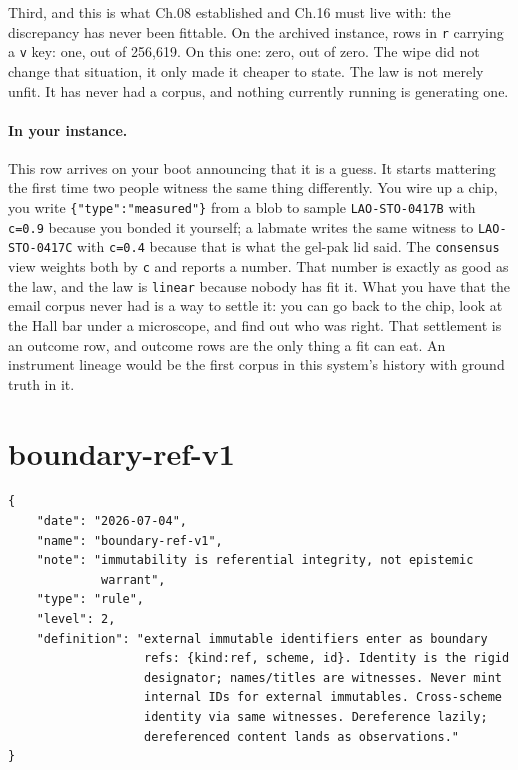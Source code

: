 Third, and this is what Ch.08 established and Ch.16 must live with: the discrepancy has never been fittable. On the archived instance, rows in \texttt{r} carrying a \texttt{v} key: one, out of 256,619. On this one: zero, out of zero. The wipe did not change that situation, it only made it cheaper to state. The law is not merely unfit. It has never had a corpus, and nothing currently running is generating one.

\paragraph{In your instance.} This row arrives on your boot announcing that it is a guess. It starts mattering the first time two people witness the same thing differently. You wire up a chip, you write \texttt{\{"type":"measured"\}} from a blob to sample \texttt{LAO-STO-0417B} with \texttt{c=0.9} because you bonded it yourself; a labmate writes the same witness to \texttt{LAO-STO-0417C} with \texttt{c=0.4} because that is what the gel-pak lid said. The \texttt{consensus} view weights both by \texttt{c} and reports a number. That number is exactly as good as the law, and the law is \texttt{linear} because nobody has fit it. What you have that the email corpus never had is a way to settle it: you can go back to the chip, look at the Hall bar under a microscope, and find out who was right. That settlement is an outcome row, and outcome rows are the only thing a fit can eat. An instrument lineage would be the first corpus in this system's history with ground truth in it.

\section{boundary-ref-v1}

\begin{lstlisting}[language={},basicstyle=\ttfamily\footnotesize]
{
    "date": "2026-07-04",
    "name": "boundary-ref-v1",
    "note": "immutability is referential integrity, not epistemic
             warrant",
    "type": "rule",
    "level": 2,
    "definition": "external immutable identifiers enter as boundary
                   refs: {kind:ref, scheme, id}. Identity is the rigid
                   designator; names/titles are witnesses. Never mint
                   internal IDs for external immutables. Cross-scheme
                   identity via same witnesses. Dereference lazily;
                   dereferenced content lands as observations."
}
\end{lstlisting}

